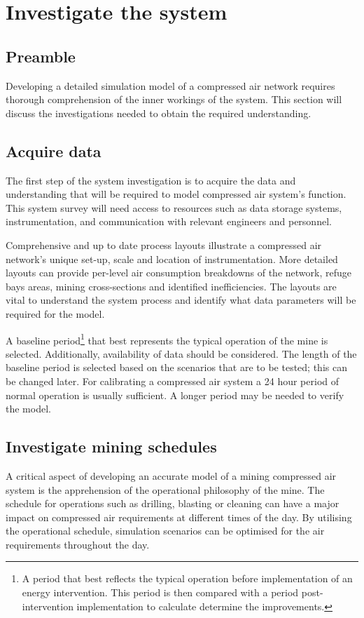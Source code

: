 \section{Investigate the system}
	\subsection{Preamble}
		Developing a detailed simulation model of a compressed air network requires thorough comprehension of the inner workings of the system. This section will discuss the investigations needed to obtain the required understanding.
	\subsection{Acquire data} %
	The first step of the system investigation is to acquire the data and understanding that will be required to model compressed air system's function. This system survey will need access to resources such as data storage systems, instrumentation, and communication with relevant engineers and personnel.
	\par 
	Comprehensive and up to date process layouts illustrate a compressed air network's unique set-up, scale and location of instrumentation. More detailed layouts can provide per-level air consumption breakdowns of the network, refuge bays areas, mining cross-sections and identified inefficiencies. The layouts are vital to understand the system process and identify what data parameters will be required for the model. 
	\par 
	A baseline period\footnote{A period that best reflects the typical operation before implementation of an energy intervention. This period is then compared with a period post-intervention implementation to calculate determine the improvements.} that best represents the typical operation of the mine is selected. Additionally, availability of data should be considered. The length of the baseline period is selected based on the scenarios that are to be tested; this can be changed later. For calibrating a compressed air system a 24 hour period of normal operation is usually sufficient. A longer period may be needed to verify the model. 

	\subsection{Investigate mining schedules}
	A critical aspect of developing an accurate model of a mining compressed air system is the apprehension of the operational philosophy of the mine. The schedule for operations such as drilling, blasting or cleaning can have a major impact on compressed air requirements at different times of the day. By utilising the operational schedule, simulation scenarios can be optimised for the air requirements throughout the day.	
	
